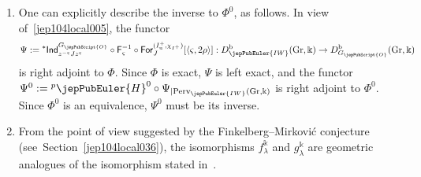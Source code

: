 \begin{rmk}
\begin{enumerate}
\item
One can explicitly describe the inverse to $\Phi^0$, as follows. In view of~\eqref{jep104local005}, the functor
\[
\Psi :={}^{*}\mathsf{Ind}_{z^{-\varsigma} J z^{\varsigma}}^{G_{\jepPubScript{O}}} \circ \mathsf{F}_\varsigma^{-1} \circ \mathsf{For}^{(I_\mathrm{u}^+, \chi_{I^+})}_J [\langle \varsigma,2\rho \rangle] : D^{\mathrm{b}}_{\jepPubEuler{IW}}(\mathrm{Gr},\Bbbk) \to D^{\mathrm{b}}_{G_{\jepPubScript{O}}}(\mathrm{Gr},\Bbbk)
\]
is right adjoint to $\Phi$. Since $\Phi$ is exact, $\Psi$ is left exact, and the functor $\Psi^0:={}^{p}\jepPubEuler{H}^0 \circ \Psi_{|\mathrm{Perv}_{\jepPubEuler{IW}}(\mathrm{Gr},\Bbbk)}$ is right adjoint to $\Phi^0$. Since $\Phi^0$ is an equivalence, $\Psi^0$ must be its inverse.
\item
 From the point of view suggested by the Finkelberg--Mirkovi\'c conjecture (see~Section~\ref{jep104local036}), the isomorphisms $f^\Bbbk_\lambda$ and $g^\Bbbk_\lambda$ are geometric analogues of the isomorphism stated in~\cite[Prop.~II.3.19]{jep104ref29}.

\end{enumerate}
\end{rmk}

